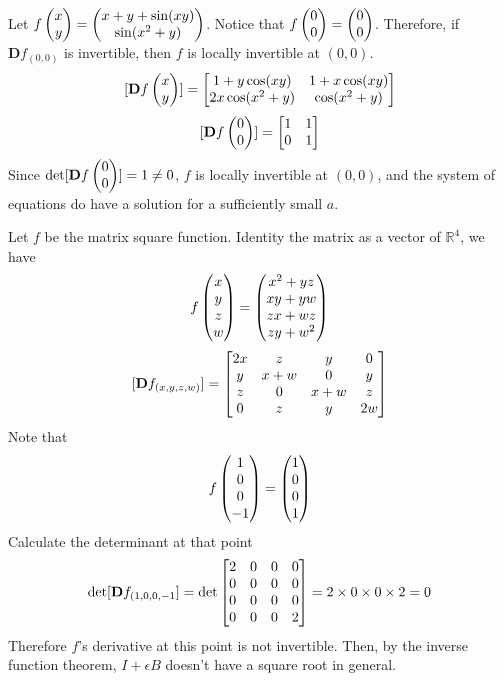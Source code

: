 \documentclass{homework}
\begin{document}
\begin{problem}{4}
Let $f\begin{pmatrix}x\\y\end{pmatrix} = \begin{pmatrix}x+y+\sin(xy)\\\sin(x^2+y)\end{pmatrix}$. Notice that $f\begin{pmatrix}0\\0\end{pmatrix} = \begin{pmatrix}0\\0\end{pmatrix}$. Therefore, if $\mathbf{D}f_{(0,0)}$ is invertible, then $f$ is locally invertible at $(0, 0)$.
$$[\mathbf{D}f\begin{pmatrix}x\\y\end{pmatrix}] = \begin{bmatrix}1+y\cos(xy)&1+x\cos(xy)\\2x\cos(x^2+y)&\cos(x^2+y)\end{bmatrix}$$
$$[\mathbf{D}f\begin{pmatrix}0\\0\end{pmatrix}] = \begin{bmatrix}1&1\\0&1\end{bmatrix}$$
Since $\det[\mathbf{D}f\begin{pmatrix}0\\0\end{pmatrix}] = 1 \ne 0$, $f$ is locally invertible at $(0, 0)$, and the system of equations do have a solution for a sufficiently small $a$.
\end{problem}

\begin{problem}{5}
Let $f$ be the matrix square function. Identity the matrix as a vector of $\mathbb{R}^4$, we have
$$f\begin{pmatrix}x\\y\\z\\w\end{pmatrix} = \begin{pmatrix}x^2+yz\\xy+yw\\zx+wz\\zy+w^2\end{pmatrix}$$
$$[\mathbf{D}f_{(x,y,z,w)}] = \begin{bmatrix}2x &   z &  y  &  0\\
                            y & x+w &  0  &  y\\
                            z &   0 & x+w &  z\\
                            0 &   z &  y  & 2w\end{bmatrix}$$
Note that
$$f\begin{pmatrix}1\\0\\0\\-1\end{pmatrix}=\begin{pmatrix}1\\0\\0\\1\end{pmatrix}$$
Calculate the determinant at that point
$$\det[\mathbf{D}f_{(1,0,0,-1}] = \det\begin{bmatrix}2&0&0&0\\0&0&0&0\\0&0&0&0\\0&0&0&2\end{bmatrix} = 2\times0\times0\times2 = 0$$
Therefore $f$'s derivative at this point is not invertible. Then, by the inverse function theorem, $I + \epsilon B$ doesn't have a square root in general.
\end{problem}
\end{document}
